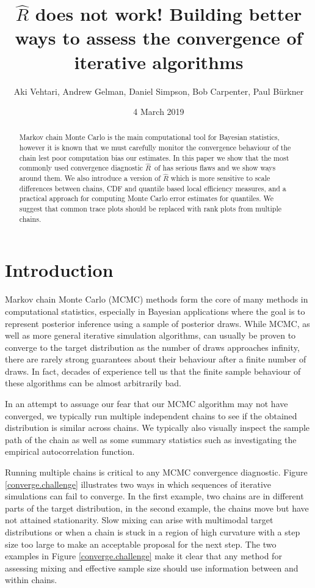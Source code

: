 \documentclass[american,]{article}
\title{$\widehat{R}$ does not work! Building better ways to assess the convergence of iterative algorithms}
\author{Aki Vehtari, Andrew Gelman, Daniel Simpson, Bob Carpenter, Paul Bürkner}
\date{4 March 2019}
\newcommand{\Rhat}{$\widehat{R}$}
\begin{document}
\maketitle
\begin{abstract}
  Markov chain Monte Carlo is the main computational tool for Bayesian 
  statistics, however it is known that we must carefully monitor the
  convergence behaviour of the chain lest poor computation bias our estimates.
In this paper we show that the most commonly used convergence diagnostic \Rhat\ 
of \citet{Gelman+Rubin:1992} has serious flaws and we
show ways around them.  We also introduce
  a version of $\widehat{R}$ which is more sensitive to scale
  differences between chains, CDF and quantile based local efficiency
  measures, and a practical approach for computing Monte Carlo error
  estimates for quantiles. We suggest that common trace plots should
  be replaced with rank plots from multiple chains.
\end{abstract}

\hypertarget{introduction}{%
\section{Introduction}\label{introduction}}

 Markov chain Monte Carlo (MCMC) methods form the core
of many methods in computational statistics, especially 
in Bayesian applications where the goal is to represent
posterior inference using a sample of posterior draws. While MCMC, 
as well as more general iterative
simulation algorithms, can usually be proven to converge
to the target distribution as the number of draws approaches infinity,
there are rarely strong guarantees about their behaviour after a 
finite number of draws. In fact, decades of experience tell us that
the finite sample behaviour of these algorithms can be almost arbitrarily bad.


In an attempt to assuage our fear that our MCMC algorithm may
not have converged, we typically run multiple 
independent chains  to see if the obtained 
distribution is similar across chains.  We typically also visually inspect
the sample path of the chain as well as some summary statistics such as
investigating the empirical autocorrelation function. 

Running multiple chains is critical to any MCMC convergence diagnostic. Figure
\ref{converge.challenge} illustrates two ways in which sequences of
iterative simulations can fail to converge.  In the first example, two chains
are in different parts of the target distribution, in the second
example, the chains move but have not attained stationarity. Slow mixing can arise with multimodal target distributions or when a chain is
stuck in a region of high curvature with a step size too large to make an
acceptable proposal for the next step. The two examples in Figure \ref{converge.challenge}  make it clear that 
any method for assessing mixing and effective sample size should use information
between and within chains.
\end{document}

